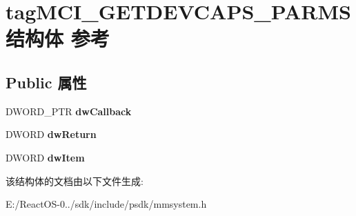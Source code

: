 \hypertarget{structtag_m_c_i___g_e_t_d_e_v_c_a_p_s___p_a_r_m_s}{}\section{tag\+M\+C\+I\+\_\+\+G\+E\+T\+D\+E\+V\+C\+A\+P\+S\+\_\+\+P\+A\+R\+M\+S结构体 参考}
\label{structtag_m_c_i___g_e_t_d_e_v_c_a_p_s___p_a_r_m_s}
\subsection*{Public 属性}
\begin{DoxyCompactItemize}
\item 
\mbox{\label{structtag_m_c_i___g_e_t_d_e_v_c_a_p_s___p_a_r_m_s_a408a387b0bb17b005ba692dc74e3e1e0}} 
D\+W\+O\+R\+D\+\_\+\+P\+TR {\bfseries dw\+Callback}
\item 
\mbox{\label{structtag_m_c_i___g_e_t_d_e_v_c_a_p_s___p_a_r_m_s_ad0e4720070c638166afd07c1b3d823d5}} 
D\+W\+O\+RD {\bfseries dw\+Return}
\item 
\mbox{\label{structtag_m_c_i___g_e_t_d_e_v_c_a_p_s___p_a_r_m_s_a663518db9a27f0b149c4928aa1e7457d}} 
D\+W\+O\+RD {\bfseries dw\+Item}
\end{DoxyCompactItemize}


该结构体的文档由以下文件生成\+:\begin{DoxyCompactItemize}
\item 
E\+:/\+React\+O\+S-\/0../sdk/include/psdk/mmsystem.\+h\end{DoxyCompactItemize}
